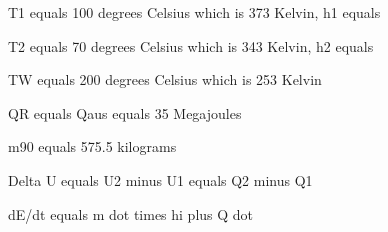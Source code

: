 T1 equals 100 degrees Celsius which is 373 Kelvin, h1 equals

T2 equals 70 degrees Celsius which is 343 Kelvin, h2 equals

TW equals 200 degrees Celsius which is 253 Kelvin

QR equals Qaus equals 35 Megajoules

m90 equals 575.5 kilograms

Delta U equals U2 minus U1 equals Q2 minus Q1

dE/dt equals m dot times hi plus Q dot